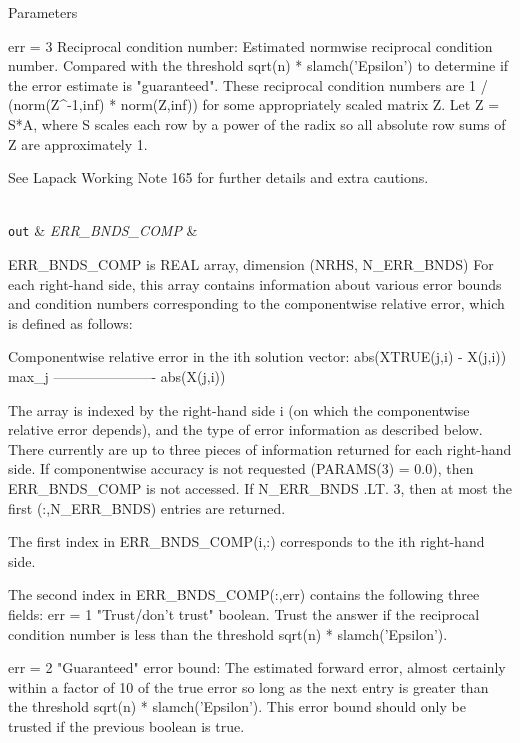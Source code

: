 \begin{DoxyParams}[1]{Parameters}
\begin{DoxyVerb}
     err = 3  Reciprocal condition number: Estimated normwise
              reciprocal condition number.  Compared with the threshold
              sqrt(n) * slamch('Epsilon') to determine if the error
              estimate is "guaranteed". These reciprocal condition
              numbers are 1 / (norm(Z^{-1},inf) * norm(Z,inf)) for some
              appropriately scaled matrix Z.
              Let Z = S*A, where S scales each row by a power of the
              radix so all absolute row sums of Z are approximately 1.

     See Lapack Working Note 165 for further details and extra
     cautions.\end{DoxyVerb}
\\
\hline
\mbox{\tt out}  & {\em E\+R\+R\+\_\+\+B\+N\+D\+S\+\_\+\+C\+O\+M\+P} & \begin{DoxyVerb}          ERR_BNDS_COMP is REAL array, dimension (NRHS, N_ERR_BNDS)
     For each right-hand side, this array contains information about
     various error bounds and condition numbers corresponding to the
     componentwise relative error, which is defined as follows:

     Componentwise relative error in the ith solution vector:
                    abs(XTRUE(j,i) - X(j,i))
             max_j ----------------------
                         abs(X(j,i))

     The array is indexed by the right-hand side i (on which the
     componentwise relative error depends), and the type of error
     information as described below. There currently are up to three
     pieces of information returned for each right-hand side. If
     componentwise accuracy is not requested (PARAMS(3) = 0.0), then
     ERR_BNDS_COMP is not accessed.  If N_ERR_BNDS .LT. 3, then at most
     the first (:,N_ERR_BNDS) entries are returned.

     The first index in ERR_BNDS_COMP(i,:) corresponds to the ith
     right-hand side.

     The second index in ERR_BNDS_COMP(:,err) contains the following
     three fields:
     err = 1 "Trust/don't trust" boolean. Trust the answer if the
              reciprocal condition number is less than the threshold
              sqrt(n) * slamch('Epsilon').

     err = 2 "Guaranteed" error bound: The estimated forward error,
              almost certainly within a factor of 10 of the true error
              so long as the next entry is greater than the threshold
              sqrt(n) * slamch('Epsilon'). This error bound should only
              be trusted if the previous boolean is true.


\end{DoxyVerb}
\end{DoxyParams}
